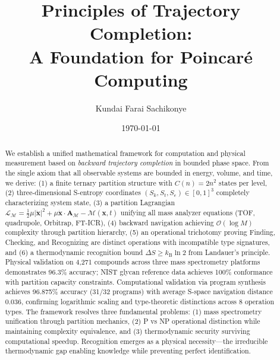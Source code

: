 \documentclass[twocolumn,10pt]{revtex4-2}
\theoremstyle{definition}
\theoremstyle{remark}
\newcommand{\kB}{k_{\mathrm{B}}}
\newcommand{\Sk}{S_k}
\newcommand{\St}{S_t}
\newcommand{\Se}{S_e}
\newcommand{\bigO}{\mathcal{O}}
\newcommand{\Mdepth}{\mathcal{M}}
\newcommand{\Lagr}{\mathcal{L}}
\newcommand{\Apartition}{\mathbf{A}_{\Mdepth}}
\newcommand{\partinert}{\mu}
\begin{document}
\title{Principles of Trajectory Completion:\\
A Foundation for Poincar\'e Computing}

\author{Kundai Farai Sachikonye}

\date{\today}

\begin{abstract}
We establish a unified mathematical framework for computation and physical measurement based on \emph{backward trajectory completion} in bounded phase space. From the single axiom that all observable systems are bounded in energy, volume, and time, we derive: (1) a finite ternary partition structure with $C(n) = 2n^2$ states per level, (2) three-dimensional S-entropy coordinates $(\Sk, \St, \Se) \in [0,1]^3$ completely characterizing system state, (3) a partition Lagrangian $\Lagr_{\Mdepth} = \frac{1}{2}\partinert|\dot{\mathbf{x}}|^2 + \partinert\dot{\mathbf{x}}\cdot\Apartition - \Mdepth(\mathbf{x}, t)$ unifying all mass analyzer equations (TOF, quadrupole, Orbitrap, FT-ICR), (4) backward navigation achieving $\bigO(\log M)$ complexity through partition hierarchy, (5) an operational trichotomy proving Finding, Checking, and Recognizing are distinct operations with incompatible type signatures, and (6) a thermodynamic recognition bound $\Delta S \geq \kB \ln 2$ from Landauer's principle. Physical validation on 4,271 compounds across three mass spectrometry platforms demonstrates 96.3\% accuracy; NIST glycan reference data achieves 100\% conformance with partition capacity constraints. Computational validation via program synthesis achieves 96.875\% accuracy (31/32 programs) with average S-space navigation distance 0.036, confirming logarithmic scaling and type-theoretic distinctions across 8 operation types. The framework resolves three fundamental problems: (1) mass spectrometry unification through partition mechanics, (2) P vs NP operational distinction while maintaining complexity equivalence, and (3) thermodynamic security surviving computational speedup. Recognition emerges as a physical necessity—the irreducible thermodynamic gap enabling knowledge while preventing perfect identification.
\end{abstract}

\maketitle

\end{document}
